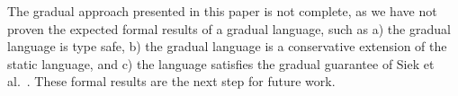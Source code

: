 \documentclass{article}
\begin{document}
The gradual approach presented in this paper is not complete, as we have not proven the expected formal results of a gradual language, such as a) the gradual language is type safe, b) the gradual language is a conservative extension of the static language, and c) the language satisfies the gradual guarantee of Siek et al.~\cite{siekAl:snapl2015}. These formal results are the next step for future work.

\medskip 

		
\end{document}
